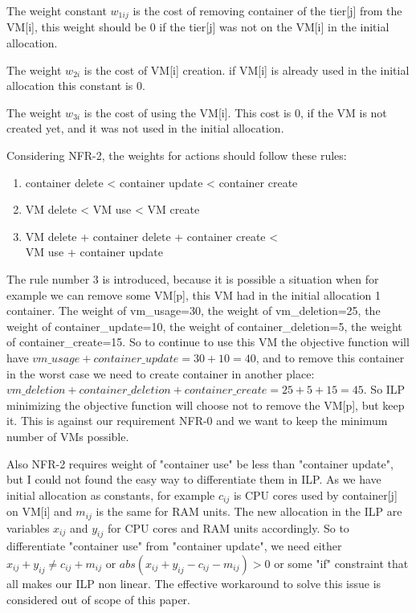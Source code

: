 The weight constant $w_{1ij}$ is the cost of removing container of the tier[j] from the VM[i], this weight should be 0 if the tier[j] was not on the VM[i] in the initial allocation.

The weight $w_{2i}$ is the cost of VM[i] creation. if VM[i] is already used in the initial allocation this constant is 0.

The weight $w_{3i}$ is the cost of using the VM[i]. This cost is 0, if 
the VM is not created yet, and it was not used in the initial allocation.

Considering NFR-2, the weights for actions should follow these rules: 
\begin{enumerate}
    \item container delete \textless{ } container update \textless{ } container create
    \item VM delete \textless{ } VM use \textless{ } VM create
    \item VM delete + container delete  + container create \textless{ } \\ VM use + container update
\end{enumerate}

 \begin{sloppypar} The rule number 3 is introduced, because it is possible a situation when for example we can remove some VM[p], this VM had in the initial allocation 1 container. The weight of vm\_usage=30, the weight of vm\_deletion=25, the weight of container\_update=10, the weight of container\_deletion=5, the weight of container\_create=15. So to continue to use this VM the objective function will have $vm\_usage + container\_update=30 + 10 = 40$, and to remove this container in the worst case we need to create container in another place: $vm\_deletion + container\_deletion + container\_create = 25 + 5 + 15 = 45$. So ILP minimizing the objective function will choose not to remove the VM[p], but keep it. This is against our requirement NFR-0 and we want to keep the minimum number of VMs possible. 
 \end{sloppypar}
 
 Also NFR-2 requires weight of "container use" be less than "container update", but I could not found the easy way to differentiate them in ILP. As we have initial allocation as constants, for example $c_{ij}$ is CPU cores used by container[j] on VM[i] and $m_{ij}$ is the same for RAM units. The new allocation in the ILP are variables $x_{ij}$ and $y_{ij}$ for CPU cores and RAM units accordingly. So to differentiate "container use" from "container update", we need either $x_{ij} + y_{ij} \neq c_{ij} + m_{ij}$ or $abs(x_{ij} + y_{ij} - c_{ij} - m_{ij}) > 0$ or some "if" constraint that all makes our ILP non linear. The effective workaround to solve this issue is considered out of scope of this paper.

